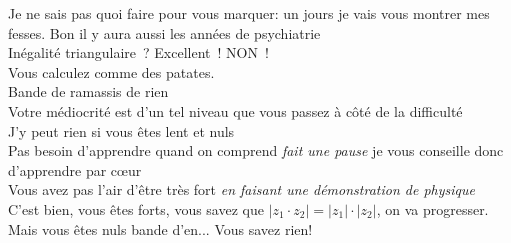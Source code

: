 \documentclass[french, a4paper, openany]{book}
\begin{document}
		\og Je ne sais pas quoi faire pour vous marquer: un jours je vais vous montrer mes fesses. Bon il y aura aussi les années de psychiatrie \fg \\
		\og Inégalité triangulaire~? Excellent~! NON~! \fg \\
		\og Vous calculez comme des patates. \fg \\
		\og Bande de ramassis de rien \fg \\
		\og Votre médiocrité est d'un tel niveau que vous passez à côté de la difficulté \fg \\
		\og J'y peut rien si vous êtes lent et nuls \fg \\
		\og Pas besoin d'apprendre quand on comprend \emph{fait une pause} je vous conseille donc d'apprendre par cœur \fg \\
		\og Vous avez pas l'air d'être très fort \fg \emph{en faisant une démonstration de physique} \\
		\og C'est bien, vous êtes forts, vous savez que $\lvert z_1 \cdot z_2 \rvert = \lvert z_1 \rvert \cdot \lvert z_2 \rvert$, on va progresser. Mais vous êtes nuls bande d'en... Vous savez rien! \fg \\
\end{document}
